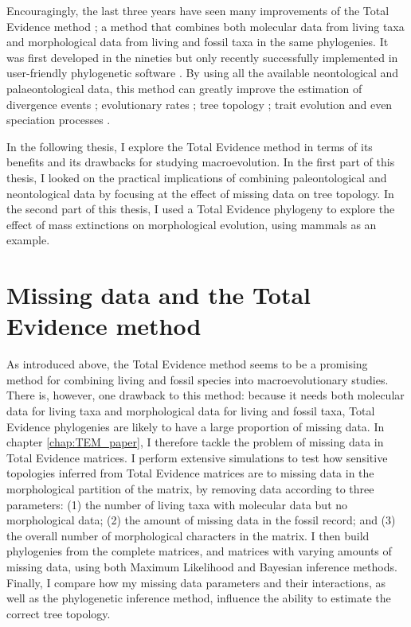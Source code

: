 Encouragingly, the last three years have seen many improvements of the Total Evidence method \citep{ronquista2012,slaterphylogenetic2013,Wood01032013,schragocombining2013,beckancient2014,Arcila2015131,Dembo2015}; a method that combines both molecular data from living taxa and morphological data from living and fossil taxa in the same phylogenies.
It was first developed in the nineties \citep{eernissetaxonomic1993} but only recently successfully implemented in user-friendly phylogenetic software \citep{Ronquist2012mrbayes,BEAST2}.
By using all the available neontological and palaeontological data, this method can greatly improve the estimation of divergence events \citep[e.g.][]{ronquista2012}; evolutionary rates \citep[e.g.][]{beckancient2014}; tree topology \citep[e.g.][]{Dembo2015}; trait evolution \citep[e.g.][]{slaterphylogenetic2013} and even speciation processes \citep[e.g.][]{Wood01032013}.

In the following thesis, I explore the Total Evidence method in terms of its benefits and its drawbacks for studying macroevolution.
In the first part of this thesis, I looked on the practical implications of combining paleontological and neontological data by focusing at the effect of missing data on tree topology.
In the second part of this thesis, I used a Total Evidence phylogeny to explore the effect of mass extinctions on morphological evolution, using mammals as an example.

\section{Missing data and the Total Evidence method}
As introduced above, the Total Evidence method seems to be a promising method for combining living and fossil species into macroevolutionary studies.
There is, however, one drawback to this method: because it needs both molecular data for living taxa and morphological data for living and fossil taxa, Total Evidence phylogenies are likely to have a large proportion of missing data.
In chapter \ref{chap:TEM_paper}, I therefore tackle the problem of missing data in Total Evidence matrices.
I perform extensive simulations to test how sensitive topologies inferred from Total Evidence matrices are to missing data in the morphological partition of the matrix, by removing data according to three parameters: (1) the number of living taxa with molecular data but no morphological data; (2) the amount of missing data in the fossil record; and (3) the overall number of morphological characters in the matrix.
I then build phylogenies from the complete matrices, and matrices with varying amounts of missing data, using both Maximum Likelihood and Bayesian inference methods.
Finally, I compare how my missing data parameters and their interactions, as well as the phylogenetic inference method, influence the ability to estimate the correct tree topology.

